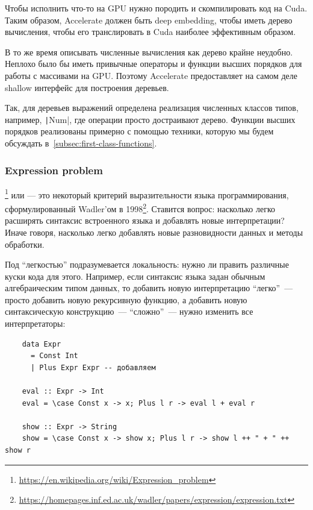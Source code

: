 Чтобы исполнить что-то на GPU нужно породить и скомпилировать код на Cuda.
Таким образом, Accelerate должен быть deep embedding, чтобы иметь дерево вычисления, чтобы его транслировать в Cuda наиболее эффективным образом.

В то же время описывать численные вычисления как дерево крайне неудобно.
Неплохо было бы иметь привычные операторы и функции высших порядков для работы с массивами на GPU\@.
Поэтому Accelerate предоставляет на самом деле shallow интерфейс для построения деревьев.

Так, для деревьев выражений определена реализация численных классов типов, например, \texttt|Num|, где операции просто достраивают дерево.
Функции высших порядков реализованы примерно с помощью техники, которую мы будем обсуждать в~\ref{subsec:first-class-functions}. %


\subsubsection{Expression problem} \label{subsec:expression-problem}

\footnote{\url{https://en.wikipedia.org/wiki/Expression_problem}} или  --- это некоторый критерий выразительности языка программирования, сформулированный Wadler'ом в 1998\footnote{\url{https://homepages.inf.ed.ac.uk/wadler/papers/expression/expression.txt}}.
Ставится вопрос: насколько легко расширять синтаксис встроенного языка и добавлять новые интерпретации?
Иначе говоря, насколько легко добавлять новые разновидности данных и методы обработки.

Под ``легкостью'' подразумевается локальность: нужно ли править различные куски кода для этого.
Например, если синтаксис языка задан обычным алгебраическим типом данных, то добавить новую интерпретацию ``легко''~--- просто добавить новую рекурсивную функцию, а добавить новую синтаксическую конструкцию~--- ``сложно''~--- нужно изменить все интерпретаторы:
\begin{verbatim}
    data Expr
      = Const Int
      | Plus Expr Expr -- добавляем

    eval :: Expr -> Int
    eval = \case Const x -> x; Plus l r -> eval l + eval r

    show :: Expr -> String
    show = \case Const x -> show x; Plus l r -> show l ++ " + " ++ show r
\end{verbatim}

